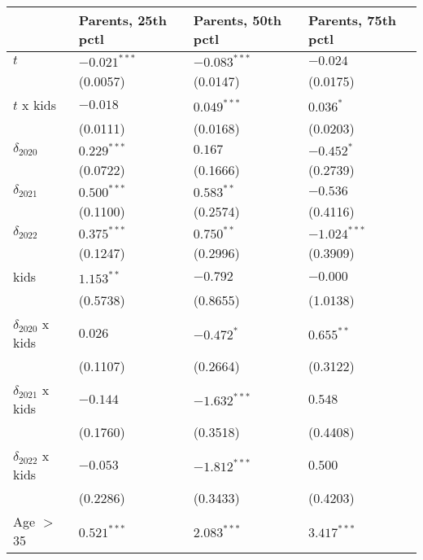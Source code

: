 \begin{tabular}{llll}
\toprule
{} & Parents, 25th pctl & Parents, 50th pctl & Parents, 75th pctl \\
\midrule
$t$                    &     $-0.021^{***}$ &     $-0.083^{***}$ &           $-0.024$ \\
                       &           (0.0057) &           (0.0147) &           (0.0175) \\
$t$ x kids             &           $-0.018$ &      $0.049^{***}$ &          $0.036^*$ \\
                       &           (0.0111) &           (0.0168) &           (0.0203) \\
$\delta_{2020}$        &      $0.229^{***}$ &            $0.167$ &         $-0.452^*$ \\
                       &           (0.0722) &           (0.1666) &           (0.2739) \\
$\delta_{2021}$        &      $0.500^{***}$ &       $0.583^{**}$ &           $-0.536$ \\
                       &           (0.1100) &           (0.2574) &           (0.4116) \\
$\delta_{2022}$        &      $0.375^{***}$ &       $0.750^{**}$ &     $-1.024^{***}$ \\
                       &           (0.1247) &           (0.2996) &           (0.3909) \\
kids                   &       $1.153^{**}$ &           $-0.792$ &           $-0.000$ \\
                       &           (0.5738) &           (0.8655) &           (1.0138) \\
$\delta_{2020}$ x kids &            $0.026$ &         $-0.472^*$ &       $0.655^{**}$ \\
                       &           (0.1107) &           (0.2664) &           (0.3122) \\
$\delta_{2021}$ x kids &           $-0.144$ &     $-1.632^{***}$ &            $0.548$ \\
                       &           (0.1760) &           (0.3518) &           (0.4408) \\
$\delta_{2022}$ x kids &           $-0.053$ &     $-1.812^{***}$ &            $0.500$ \\
                       &           (0.2286) &           (0.3433) &           (0.4203) \\
Age $>$ 35             &      $0.521^{***}$ &      $2.083^{***}$ &      $3.417^{***}$ \\

\end{tabular}
